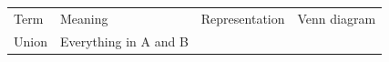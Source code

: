         \begin{center}
      
      \label{m39373*eip-360}
      
    \noindent
      \tablelasttail{}
      \begin{xtabular*}{\mytablewidth}[t]{|p{10\mystarwidth}|p{10\mystarwidth}|p{10\mystarwidth}|p{10\mystarwidth}|}\hline
    
    
        Term &
    
    
        Meaning &
    
    
        Representation &
    
    
        Venn diagram%
     \tabularnewline{}
    
    
        Union &
    
    
        Everything in A and B &
    
    

\end{xtabular*}
\end{center}
